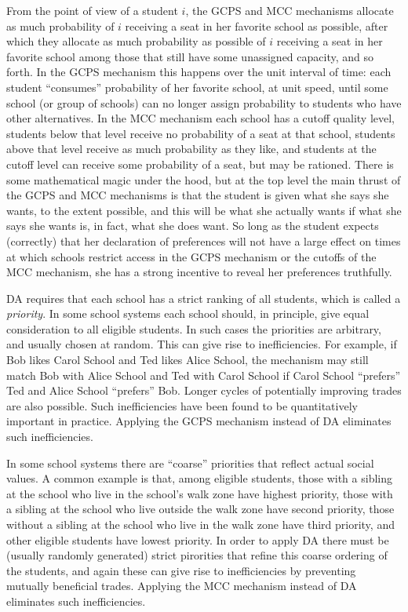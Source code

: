 \documentclass[12pt]{article}
\theoremstyle{definition}
\begin{document}
From the point of view of a student $i$, the GCPS and MCC mechanisms
allocate as much probability of $i$ receiving a seat in her favorite
school as possible, after which they allocate as much probability as
possible of $i$ receiving a seat in her favorite school among those
that still have some unassigned capacity, and so forth.  In the GCPS
mechanism this happens over the unit interval of time: each student
``consumes'' probability of her favorite school, at unit speed, until
some school (or group of schools) can no longer assign probability to
students who have other alternatives.  In the MCC mechanism each
school has a cutoff quality level, students below that level receive
no probability of a seat at that school, students above that level
receive as much probability as they like, and students at the cutoff
level can receive some probability of a seat, but may be rationed.
There is some mathematical magic under the hood, but at the top level
the main thrust of the GCPS and MCC mechanisms is that the student is
given what she says she wants, to the extent possible, and this will
be what she actually wants if what she says she wants is, in fact,
what she does want.  So long as the student expects (correctly) that
her declaration of preferences will not have a large effect on times
at which schools restrict access in the GCPS mechanism or the cutoffs
of the MCC mechanism, she has a strong incentive to reveal her
preferences truthfully.

DA requires that each school has a strict ranking of all students,
which is called a \emph{priority}.  In some school systems each school
should, in principle, give equal consideration to all eligible
students.  In such cases the priorities are arbitrary, and usually
chosen at random.  This can give rise to inefficiencies.  For example,
if Bob likes Carol School and Ted likes Alice School, the mechanism
may still match Bob with Alice School and Ted with Carol School if
Carol School ``prefers'' Ted and Alice School ``prefers'' Bob.  Longer
cycles of potentially improving trades are also possible.  Such
inefficiencies have been found to be quantitatively important in
practice.  Applying the GCPS mechanism instead of DA eliminates such
inefficiencies.

In some school systems there are ``coarse'' priorities that reflect
actual social values.  A common example is that, among eligible
students, those with a sibling at the school who live in the school's
walk zone have highest priority, those with a sibling at the school
who live outside the walk zone have second priority, those without a
sibling at the school who live in the walk zone have third priority,
and other eligible students have lowest priority.  In order to apply
DA there must be (usually randomly generated) strict pirorities that
refine this coarse ordering of the students, and again these can give
rise to inefficiencies by preventing mutually beneficial trades.
Applying the MCC mechanism instead of DA eliminates such
inefficiencies.
\end{document}
